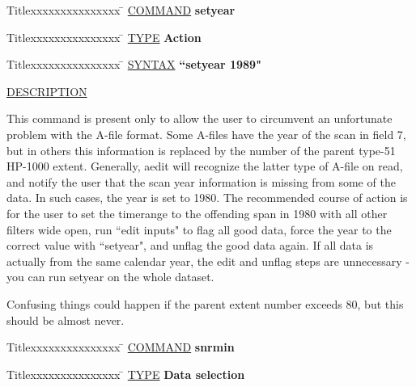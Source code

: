 \begin{tabbing}
Titlexxxxxxxxxxxxxxx \= \kill
\underline{COMMAND} \> {\bf 	setyear} \\
\end{tabbing}

\begin{tabbing}
Titlexxxxxxxxxxxxxxx \= \kill
\underline{TYPE} \> {\bf 		Action} \\
\end{tabbing}

\begin{tabbing}
Titlexxxxxxxxxxxxxxx \= \kill
\underline{SYNTAX} \> {\bf 		``setyear 1989"} \\
\end{tabbing}

\underline{DESCRIPTION}
\begin{list}{}{\setlength{\leftmargin}{0.5in}
     \setlength{\rightmargin}{0in}}
\item
This command is present only to allow the user to circumvent an
unfortunate problem with the A-file format.  Some A-files have
the year of the scan in field 7, but in others this information
is replaced by the number of the parent type-51 HP-1000 extent.
Generally, aedit will recognize the latter type of A-file on
read, and notify the user that the scan year information is
missing from some of the data.  In such cases, the year is set
to 1980.  The recommended course of action is for the user to
set the timerange to the offending span in 1980 with all other
filters wide open, run ``edit inputs" to flag all good data,
force the year to the correct value with ``setyear", and unflag
the good data again.  If all data is actually from the same
calendar year, the edit and unflag steps are unnecessary - you
can run setyear on the whole dataset.
\item
Confusing things could happen if the parent extent number exceeds
80, but this should be almost never.
\end{list}
\vspace{.2in}

\begin{tabbing}
Titlexxxxxxxxxxxxxxx \= \kill
\underline{COMMAND} \> {\bf 	snrmin} \\
\end{tabbing}

\begin{tabbing}
Titlexxxxxxxxxxxxxxx \= \kill
\underline{TYPE} \> {\bf 		Data selection} \\
\end{tabbing}

